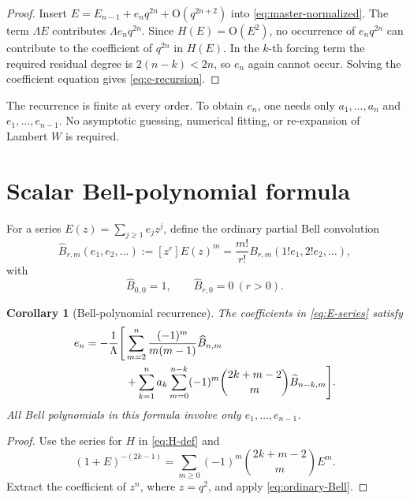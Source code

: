 \documentclass[11pt,a4paper,oneside]{book}
\newtheorem{corollary}[theorem]{Corollary}
\newcommand{\coeff}[2]{\left[#1\right]#2}
\newcommand{\Ord}{\mathrm O}
\begin{document}
\begin{proof}
Insert
\(E=E_{n-1}+e_nq^{2n}+\Ord(q^{2n+2})\) into
\cref{eq:master-normalized}.  The term \(\Lambda E\) contributes
\(\Lambda e_nq^{2n}\).  Since \(H(E)=\Ord(E^2)\), no occurrence of
\(e_nq^{2n}\) can contribute to the coefficient of \(q^{2n}\) in \(H(E)\).
In the \(k\)-th forcing term the required residual degree is \(2(n-k)<2n\),
so \(e_n\) again cannot occur.  Solving the coefficient equation gives
\cref{eq:e-recursion}.
\end{proof}

\begin{methodbox}
The recurrence is finite at every order.  To obtain \(e_n\), one needs only
\(a_1,\ldots,a_n\) and \(e_1,\ldots,e_{n-1}\).  No asymptotic guessing,
numerical fitting, or re-expansion of Lambert \(W\) is required.
\end{methodbox}

\section{Scalar Bell-polynomial formula}

For a series \(E(z)=\sum_{j\ge1}e_jz^j\), define the ordinary partial Bell
convolution
\begin{equation}\label{eq:ordinary-Bell}
 \widehat B_{r,m}(e_1,e_2,\ldots)
 :=\coeff{z^r}{E(z)^m}
 =\frac{m!}{r!}
 B_{r,m}(1!e_1,2!e_2,\ldots),
\end{equation}
with
\[
 \widehat B_{0,0}=1,\qquad
 \widehat B_{r,0}=0\ (r>0).
\]

\begin{corollary}[Bell-polynomial recurrence]\label{cor:Bell-recurrence}
The coefficients in \cref{eq:E-series} satisfy
\begin{align}
 e_n=-\frac1\Lambda\Bigg[
 &\sum_{m=2}^n
 \frac{(-1)^m}{m(m-1)}
 \widehat B_{n,m}\notag\\
 &+\sum_{k=1}^n a_k
 \sum_{m=0}^{n-k}
 (-1)^m\binom{2k+m-2}{m}
 \widehat B_{n-k,m}
 \Bigg].
 \label{eq:e-Bell}
\end{align}
All Bell polynomials in this formula involve only
\(e_1,\ldots,e_{n-1}\).
\end{corollary}

\begin{proof}
Use the series for \(H\) in \cref{eq:H-def} and
\[
 (1+E)^{-(2k-1)}
 =\sum_{m\ge0}
 (-1)^m\binom{2k+m-2}{m}E^m.
\]
Extract the coefficient of \(z^n\), where \(z=q^2\), and apply
\cref{eq:ordinary-Bell}.
\end{proof}
\end{document}
